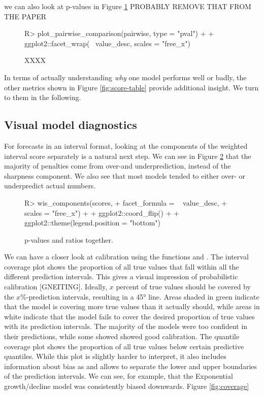\documentclass[article]{jss}
\newcommand{\fct}[1]{\code{#1()}}
\begin{document}
we can also look at p-values in Figure \ref{fig:pairwise-comparison-pval} PROBABLY REMOVE THAT FROM THE PAPER
\begin{figure}[h!]
\centering
\begin{Schunk}
\begin{Sinput}
R> plot_pairwise_comparison(pairwise, type = "pval") +
+    ggplot2::facet_wrap(~ value_desc, scales = "free_x") 
\end{Sinput}
\end{Schunk}
\caption{\label{fig:pairwise-comparison-pval} XXXX}
\end{figure}

In terms of actually understanding \textit{why} one model performs well or badly, the other metrics shown in Figure \ref{fig:score-table} provide additional insight. We turn to them in the following. 

\subsection{Visual model diagnostics}

For forecasts in an interval format, looking at the components of the weighted interval score separately is a natural next step. We can see in Figure \ref{fig:wis-components} that the majority of penalties come from over-and underprediction, instead of the sharpness component. We also see that most models tended to either over- or underpredict actual numbers.  

\begin{figure}[h!]
\centering
\begin{Schunk}
\begin{Sinput}
R> wis_components(scores, 
+                 facet_formula = ~ value_desc, 
+                 scales = "free_x") + 
+    ggplot2::coord_flip() + 
+    ggplot2::theme(legend.position = "bottom")
\end{Sinput}
\end{Schunk}
\caption{\label{fig:wis-components} p-values and ratios together.}
\end{figure}

We can have a closer look at calibration using the functions \fct{interval\_coverage} and \fct{quantile\_coverage}. The interval coverage plot shows the proportion of all true values that fall within all the different prediction intervals. This gives a visual impression of probabilistic calibration [GNEITING]. Ideally, $x$ percent of true values should be covered by the $x$\%-prediction intervals, resulting in a 45° line. Areas shaded in green indicate that the model is covering more true values than it actually should, while areas in white indicate that the model fails to cover the desired proportion of true values with its prediction intervals. The majority of the models were too confident in their predictions, while some showed showed good calibration. The quantile coverage plot shows the proportion of all true values below certain predictive quantiles. While this plot is slightly harder to interpret, it also includes information about bias as and allows to separate the lower and upper boundaries of the prediction intervals. We can see, for example, that the Exponential growth/decline model was consistently biased downwards. Figure \ref{fig:coverage}
\end{document}
